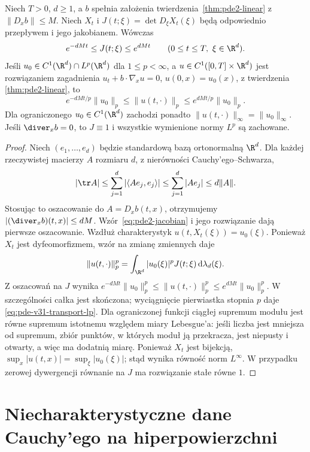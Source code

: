 \begin{stwierdzenie}
\label{prop:pde-v31-transport-lp}
Niech $T>0$, $d\ge1$, a $b$ spełnia założenia
twierdzenia~\ref{thm:pde2-linear} z $\|D_xb\|\le M$.
Niech $X_t$ i $J(t;\xi)=\det D_\xi X_t(\xi)$ będą
odpowiednio przepływem i jego jakobianem. Wówczas
\[
 e^{-dMt}\le J(t;\xi)\le e^{dMt}
 \qquad(0\le t\le T,\ \xi\in\R^d).
\]
Jeśli $u_0\in C^1(\R^d)\cap L^p(\R^d)$ dla
$1\le p<\infty$, a $u\in C^1([0,T]\times\R^d)$
jest rozwiązaniem zagadnienia
$u_t+b\cdot\nabla_xu=0$, $u(0,x)=u_0(x)$,
z twierdzenia \ref{thm:pde2-linear}, to
\begin{equation}\label{eq:pde-v31-transport-lp}
 e^{-dMt/p}\|u_0\|_p\le\|u(t,\cdot)\|_p
 \le e^{dMt/p}\|u_0\|_p.
\end{equation}
Dla ograniczonego $u_0\in C^1(\R^d)$ zachodzi ponadto
$\|u(t,\cdot)\|_\infty=\|u_0\|_\infty$.
Jeśli $\diver_xb=0$, to $J\equiv1$ i wszystkie wymienione
normy $L^p$ są zachowane.
\end{stwierdzenie}
\begin{proof}
Niech $(e_1,\ldots,e_d)$ będzie standardową bazą
ortonormalną $\R^d$. Dla każdej rzeczywistej macierzy
$A$ rozmiaru $d$, z nierówności Cauchy'ego--Schwarza,
\[
 |\tr A|\le\sum_{j=1}^d|\langle Ae_j,e_j\rangle|
 \le\sum_{j=1}^d |Ae_j|\le d\|A\|.
\]
Stosując to oszacowanie do $A=D_xb(t,x)$, otrzymujemy
$|(\diver_xb)(t,x)|\le dM$.
Wzór~\eqref{eq:pde2-jacobian} i jego rozwiązanie dają
pierwsze oszacowanie. Wzdłuż charakterystyk
$u(t,X_t(\xi))=u_0(\xi)$. Ponieważ $X_t$ jest
dyfeomorfizmem, wzór na zmianę zmiennych daje
\[
 \|u(t,\cdot)\|_p^p
 =\int_{\R^d}|u_0(\xi)|^pJ(t;\xi)\,
   \mathrm d\lambda_d(\xi).
\]
Z oszacowań na $J$ wynika
$e^{-dMt}\|u_0\|_p^p\le\|u(t,\cdot)\|_p^p
\le e^{dMt}\|u_0\|_p^p$. W szczególności całka jest
skończona; wyciągnięcie pierwiastka stopnia $p$
daje \eqref{eq:pde-v31-transport-lp}.
Dla ograniczonej funkcji ciągłej supremum modułu jest
równe supremum istotnemu względem miary Lebesgue'a:
jeśli liczba jest mniejsza od supremum, zbiór punktów,
w których moduł ją przekracza, jest niepusty i otwarty,
a więc ma dodatnią miarę. Ponieważ $X_t$ jest bijekcją,
$\sup_x|u(t,x)|=\sup_\xi|u_0(\xi)|$; stąd wynika równość
norm $L^\infty$. W przypadku zerowej dywergencji
równanie na $J$ ma rozwiązanie stałe równe $1$.
\end{proof}

\section{Niecharakterystyczne dane Cauchy'ego na hiperpowierzchni}
\label{sec:pde2-noncharacteristic}

